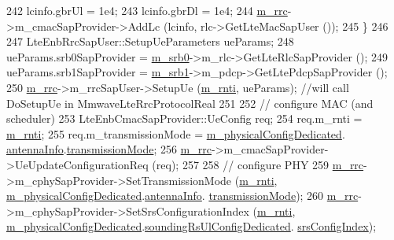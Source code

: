 \begin{DoxyCode}
242     lcinfo.gbrUl = 1e4;
243     lcinfo.gbrDl = 1e4;
244     \hyperlink{classns3_1_1UeManager_ab4405e9f354c66e7c1a4c95832290f5b}{m\_rrc}->m\_cmacSapProvider->AddLc (lcinfo, rlc->GetLteMacSapUser ());
245   \}
246 
247   LteEnbRrcSapUser::SetupUeParameters ueParams;
248   ueParams.srb0SapProvider = \hyperlink{classns3_1_1UeManager_a8125951721a3aeefbf6ea5af111f2f3f}{m\_srb0}->m\_rlc->GetLteRlcSapProvider ();
249   ueParams.srb1SapProvider = \hyperlink{classns3_1_1UeManager_a196852199b6a48c365eadfec4ba89935}{m\_srb1}->m\_pdcp->GetLtePdcpSapProvider ();
250   \hyperlink{classns3_1_1UeManager_ab4405e9f354c66e7c1a4c95832290f5b}{m\_rrc}->m\_rrcSapUser->SetupUe (\hyperlink{classns3_1_1UeManager_a5a72b4fe818f21993bd7f05d7e2c4f83}{m\_rnti}, ueParams); \textcolor{comment}{//will call DoSetupUe in
       MmwaveLteRrcProtocolReal}
251 
252   \textcolor{comment}{// configure MAC (and scheduler)}
253   LteEnbCmacSapProvider::UeConfig req;
254   req.m\_rnti = \hyperlink{classns3_1_1UeManager_a5a72b4fe818f21993bd7f05d7e2c4f83}{m\_rnti};
255   req.m\_transmissionMode = \hyperlink{classns3_1_1UeManager_a5fca85495adcd0de6823e738094aacaf}{m\_physicalConfigDedicated}.
      \hyperlink{structns3_1_1LteRrcSap_1_1PhysicalConfigDedicated_ae7fc9e40e971e9bdaf9f06e3a0ca9a56}{antennaInfo}.\hyperlink{structns3_1_1LteRrcSap_1_1AntennaInfoDedicated_af0565283e3839265f42c75c9f5b37c8c}{transmissionMode};
256   \hyperlink{classns3_1_1UeManager_ab4405e9f354c66e7c1a4c95832290f5b}{m\_rrc}->m\_cmacSapProvider->UeUpdateConfigurationReq (req);
257 
258   \textcolor{comment}{// configure PHY}
259   \hyperlink{classns3_1_1UeManager_ab4405e9f354c66e7c1a4c95832290f5b}{m\_rrc}->m\_cphySapProvider->SetTransmissionMode (\hyperlink{classns3_1_1UeManager_a5a72b4fe818f21993bd7f05d7e2c4f83}{m\_rnti}, 
      \hyperlink{classns3_1_1UeManager_a5fca85495adcd0de6823e738094aacaf}{m\_physicalConfigDedicated}.\hyperlink{structns3_1_1LteRrcSap_1_1PhysicalConfigDedicated_ae7fc9e40e971e9bdaf9f06e3a0ca9a56}{antennaInfo}.
      \hyperlink{structns3_1_1LteRrcSap_1_1AntennaInfoDedicated_af0565283e3839265f42c75c9f5b37c8c}{transmissionMode});
260   \hyperlink{classns3_1_1UeManager_ab4405e9f354c66e7c1a4c95832290f5b}{m\_rrc}->m\_cphySapProvider->SetSrsConfigurationIndex (\hyperlink{classns3_1_1UeManager_a5a72b4fe818f21993bd7f05d7e2c4f83}{m\_rnti}, 
      \hyperlink{classns3_1_1UeManager_a5fca85495adcd0de6823e738094aacaf}{m\_physicalConfigDedicated}.\hyperlink{structns3_1_1LteRrcSap_1_1PhysicalConfigDedicated_ab37d726f290ebc8cd81e8d4f68939fdc}{soundingRsUlConfigDedicated}.
      \hyperlink{structns3_1_1LteRrcSap_1_1SoundingRsUlConfigDedicated_a2cbee1ba9dd47b4b690a8d0e91d209be}{srsConfigIndex});

\end{DoxyCode}
